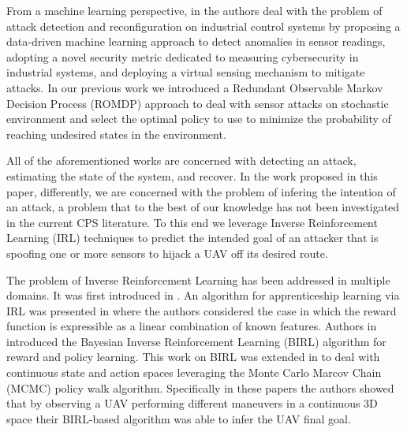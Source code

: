 \documentclass[letterpaper, 10 pt, conference]{ieeeconf}  %
\newcommand\NB[1]{$\spadesuit$\footnote{NB: #1}}
\begin{document}
From a machine learning perspective, in \cite{paridari2017framework} the authors deal with the problem of attack detection and reconfiguration on industrial control systems by proposing a data-driven machine learning approach to detect anomalies in sensor readings,  adopting a novel security metric dedicated to measuring cybersecurity in industrial systems, and deploying a virtual sensing mechanism to mitigate attacks. 
In our previous work \cite{bezzo2016stochastic} we introduced a Redundant Observable Markov Decision Process (ROMDP) approach to deal with sensor attacks on stochastic environment and select the optimal policy to use to minimize the probability of reaching undesired states in the environment. 

All of the aforementioned works are concerned with detecting an attack, estimating the state of the system, and recover. In the work proposed in this paper, differently, we are concerned with the problem of infering the intention of an attack, a problem that to the best of our knowledge has not been investigated in the current CPS literature.
To this end we leverage Inverse Reinforcement Learning (IRL) techniques to predict the intended goal of an attacker that is spoofing one or more sensors to hijack a UAV off its desired route.
%

The problem of Inverse Reinforcement Learning has been addressed in multiple domains. It was first introduced in \cite{ng2000algorithms}. An algorithm for apprenticeship learning via IRL was presented in \cite{abbeel2004apprenticeship} where the authors considered the case in which the reward function is expressible as a linear combination of known features. 
Authors in \cite{ramachandran2007bayesian} introduced the Bayesian Inverse Reinforcement Learning (BIRL) algorithm for reward and policy learning. This work on BIRL was extended in \cite{michini2015bayesian,michini2013scalable,michini2012improving} to deal with continuous state and action spaces leveraging the Monte Carlo Marcov Chain (MCMC) policy walk algorithm. Specifically in these papers the authors  showed that by observing a UAV performing different maneuvers in a continuous 3D space their BIRL-based algorithm was able to infer the UAV final goal. 
\end{document}
